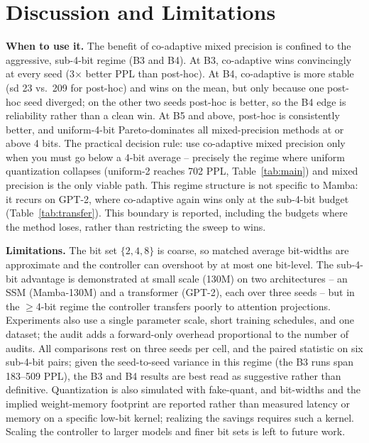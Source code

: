 \documentclass[conference]{IEEEtran}
\begin{document}
\section{Discussion and Limitations}
\noindent\textbf{When to use it.} The benefit of co-adaptive mixed precision is
confined to the aggressive, sub-4-bit regime (B3 and B4). At B3, co-adaptive wins
convincingly at every seed (3$\times$ better PPL than post-hoc). At B4, co-adaptive
is more stable (sd 23 vs.\ 209 for post-hoc) and wins on the mean, but only because
one post-hoc seed diverged; on the other two seeds post-hoc is better, so the B4
edge is reliability rather than a clean win. At B5 and above, post-hoc is consistently better, and
uniform-4-bit Pareto-dominates all mixed-precision methods at or above 4 bits.
The practical decision rule: use co-adaptive mixed precision only when you must go
below a 4-bit average -- precisely the regime where uniform quantization collapses
(uniform-2 reaches 702 PPL, Table~\ref{tab:main}) and mixed precision is the only
viable path. This regime structure is not specific to Mamba: it recurs on GPT-2,
where co-adaptive again wins only at the sub-4-bit budget (Table~\ref{tab:transfer}).
This boundary is reported, including the budgets where the method loses, rather than
restricting the sweep to wins.

\noindent\textbf{Limitations.} The bit set \(\{2,4,8\}\) is coarse, so matched
average bit-widths are approximate and the controller can overshoot by at most one
bit-level. The sub-4-bit advantage is demonstrated at small scale (130M) on two architectures
-- an SSM (Mamba-130M) and a transformer (GPT-2), each over three seeds -- but in
the $\geq$4-bit regime the controller transfers poorly to attention projections.
Experiments also use a single parameter scale, short training schedules, and one
dataset; the audit
adds a forward-only overhead proportional to the number of audits. All comparisons
rest on three seeds per cell, and the paired statistic on six sub-4-bit pairs; given
the seed-to-seed variance in this regime (the B3 runs span 183--509 PPL), the B3 and
B4 results are best read as suggestive rather than definitive. Quantization is also simulated with fake-quant, and
bit-widths and the implied weight-memory footprint are reported rather than measured latency or
memory on a specific low-bit kernel; realizing the savings requires such a kernel.
Scaling the controller to larger models and finer bit sets is left to future work.
\end{document}
